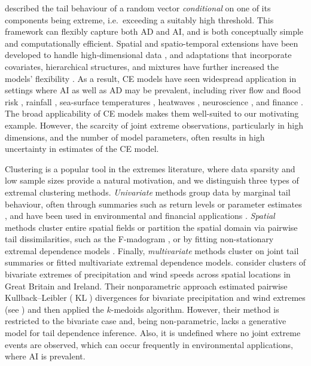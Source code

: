 \documentclass[12pt,compact]{article}
\DeclareMathOperator{\KL}{KL}
\begin{document}
\citet{Heffernan2004} described the tail behaviour of a random vector \emph{conditional} on one of its components being extreme, i.e.\ exceeding a suitably high threshold. 
This framework can flexibly capture both AD and AI, and is both conceptually simple and computationally efficient.
Spatial and spatio-temporal extensions have been developed to handle high-dimensional data \citep{Simpson2021, Wadsworth2022}, and adaptations that incorporate covariates, hierarchical structures, and mixtures have further increased the models' flexibility \citep{Richards2023, Tendijck2023, Talento2025}.
As a result, CE models have seen widespread application in settings where AI as well as AD may be prevalent, including river flow and flood risk \citep{Gilleland2013, Jane2020}, rainfall \citep{Richards2022}, sea-surface temperatures \citep{Simpson2023,Kakampakou2024}, heatwaves \citep{Winter2016}, neuroscience \citep{Guerrero2023, Talento2025}, and finance \citep{Hilal2014}. 
The broad applicability of CE models makes them well-suited to our motivating example.
However, the scarcity of joint extreme observations, particularly in high dimensions, and the number of model parameters, often results in high uncertainty in estimates of the CE model.

Clustering is a popular tool in the extremes literature, where data sparsity and low sample sizes provide a natural motivation, and we distinguish three types of extremal clustering methods.
\emph{Univariate} methods group data by marginal tail behaviour, often through summaries such as return levels or parameter estimates \citep{Coles2001}, and have been used in environmental and financial applications \citep{Alonso2014-rr, deCarvalho2023, Zheng2023-jf}.
\emph{Spatial} methods cluster entire spatial fields or partition the spatial domain via pairwise tail dissimilarities, such as the F-madogram \citep{Cooley2006variograms, Bernard2013}, or by fitting non-stationary extremal dependence models \citep{Carreau2017, Rohrbeck2021, Dupuis2023, Shao2025}. 
Finally, \emph{multivariate} methods cluster on joint tail summaries or fitted multivariate extremal dependence models. 
\citet{Vignotto2021} consider clusters of bivariate extremes of precipitation and wind speeds across spatial locations in Great Britain and Ireland.
Their nonparametric approach estimated pairwise Kullback--Leibler ($\KL{}$) \citep{Kullback1951} divergences for bivariate precipitation and wind extremes (see \citet{Zscheischler2021}) and then applied the $k$-medoids algorithm. 
However, their method is restricted to the bivariate case and,
being non-parametric, lacks a generative model for tail dependence inference. 
Also, it is undefined where no joint extreme events are observed, which can occur frequently in environmental applications, where AI is prevalent.
\end{document}
